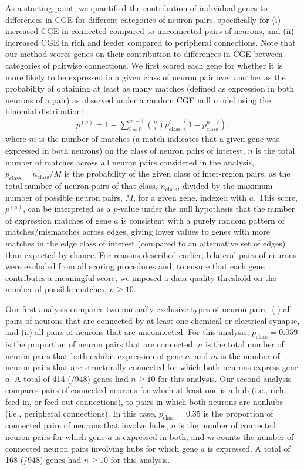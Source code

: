 As a starting point, we quantified the contribution of individual genes to differences in CGE for different categories of neuron pairs, specifically for (i) increased CGE in connected compared to unconnected pairs of neurons, and (ii) increased CGE in rich and feeder compared to peripheral connections.
Note that our method scores genes on their contribution to differences in CGE between categories of pairwise connections.
We first scored each gene for whether it is more likely to be expressed in a given class of neuron pair over another as the probability of obtaining at least as many matches (defined as expression in both neurons of a pair) as observed under a random CGE null model using the binomial distribution:
\begin{eqnarray}
	\label{eq:CBinomialProbability}
     p^{(a)} = 1 - \sum_{i=0}^{m-1}\binom{n}{i} p_\mathrm{class}^{i}(1-p_\mathrm{class}^{n-i}),
\end{eqnarray}
where $m$ is the number of matches (a match indicates that a given gene was expressed in both neurons) on the class of neuron pairs of interest, $n$ is the total number of matches across all neuron pairs considered in the analysis, $p_\mathrm{class} = n_\mathrm{class}/M$ is the probability of the given class of inter-region pairs, as the total number of neuron pairs of that class, $n_\mathrm{class}$, divided by the maximum number of possible neuron pairs, $M$, for a given gene, indexed with $a$.
This score, $p^{(a)}$, can be interpreted as a $p$-value under the null hypothesis that the number of expression matches of gene $a$ is consistent with a purely random pattern of matches/mismatches across edges, giving lower values to genes with more matches in the edge class of interest (compared to an alternative set of edges) than expected by chance.
For reasons described earlier, bilateral pairs of neurons were excluded from all scoring procedures and, to ensure that each gene contributes a meaningful score, we imposed a data quality threshold on the number of possible matches, $n \geq 10$.

Our first analysis compares two mutually exclusive types of neuron pairs:
(i) all pairs of neurons that are connected by at least one chemical or electrical synapse, and
(ii) all pairs of neurons that are unconnected.
For this analysis, $p_\mathrm{class} = 0.059$ is the proportion of neuron pairs that are connected, $n$ is the total number of neuron pairs that both exhibit expression of gene $a$, and $m$ is the number of neuron pairs that are structurally connected for which both neurons express gene $a$.
A total of 414 (/948) genes had $n \geq 10$ for this analysis.
Our second analysis compares pairs of connected neurons for which at least one is a hub (i.e., rich, feed-in, or feed-out connections), to pairs in which both neurons are nonhubs (i.e., peripheral connections).
In this case, $p_\mathrm{class} = 0.35$ is the proportion of connected pairs of neurons that involve hubs, $n$ is the number of connected neuron pairs for which gene $a$ is expressed in both, and $m$ counts the number of connected neuron pairs involving hubs for which gene $a$ is expressed.
A total of 168 (/948) genes had $n \geq 10$ for this analysis.

